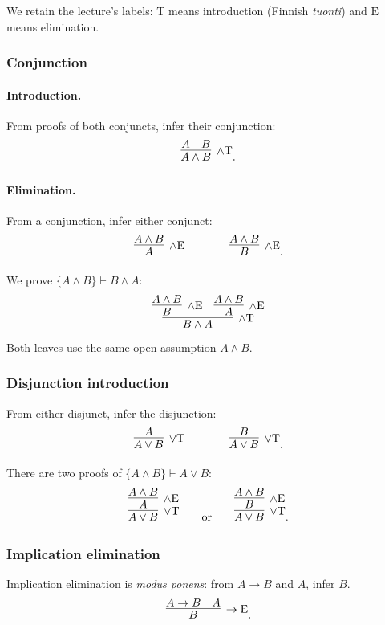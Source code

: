 \documentclass[11pt,a4paper]{amsart}
\begin{document}
We retain the lecture's labels: \(\mathrm T\) means introduction
(Finnish \emph{tuonti}) and \(\mathrm E\) means elimination.

\subsubsection{Conjunction}

\paragraph{Introduction.} From proofs of both conjuncts, infer their
conjunction:
\[
  \infer[\land\mathrm T]{A\land B}{A & B}.
\]
\paragraph{Elimination.} From a conjunction, infer either conjunct:
\[
  \infer[\land\mathrm E]{A}{A\land B}
  \qquad\qquad
  \infer[\land\mathrm E]{B}{A\land B}.
\]

\begin{example}
  We prove \(\{A\land B\}\vdash B\land A\):
  \[
    \infer[\land\mathrm T]{B\land A}{
      \infer[\land\mathrm E]{B}{A\land B}
    & \infer[\land\mathrm E]{A}{A\land B}}
  \]
  Both leaves use the same open assumption \(A\land B\).
\end{example}

\subsubsection{Disjunction introduction}

From either disjunct, infer the disjunction:
\[
  \infer[\lor\mathrm T]{A\lor B}{A}
  \qquad\qquad
  \infer[\lor\mathrm T]{A\lor B}{B}.
\]

\begin{example}
  There are two proofs of \(\{A\land B\}\vdash A\lor B\):
  \[
    \infer[\lor\mathrm T]{A\lor B}{
    \infer[\land\mathrm E]{A}{A\land B}}
    \qquad\text{or}\qquad
    \infer[\lor\mathrm T]{A\lor B}{
    \infer[\land\mathrm E]{B}{A\land B}}.
  \]
\end{example}

\subsubsection{Implication elimination}

Implication elimination is \emph{modus ponens}: from \(A\to B\) and \(A\),
infer \(B\).
\[
  \infer[\to\mathrm E]{B}{A\to B & A}.
\]
\end{document}
